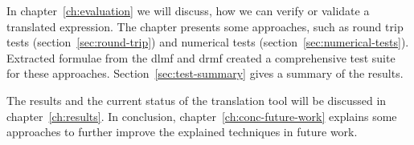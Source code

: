 In chapter~\ref{ch:evaluation} we will discuss, how we can verify or validate a translated expression. The chapter presents some approaches, such as round trip tests (section~\ref{sec:round-trip}) and numerical tests (section~\ref{sec:numerical-tests}). Extracted formulae from the \gls{dlmf} and \gls{drmf} created a comprehensive test suite for these approaches. Section~\ref{sec:test-summary} gives a summary of the results.

The results and the current status of the translation tool will be discussed in chapter~\ref{ch:results}. In conclusion, chapter~\ref{ch:conc-future-work} explains some approaches to further improve the explained techniques in future work.